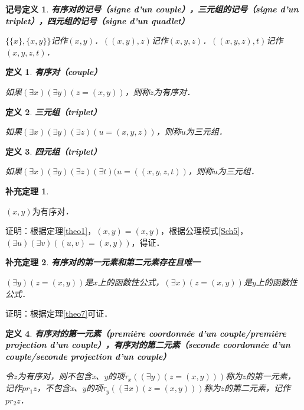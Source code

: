 \documentclass[12pt, a4paper, oneside]{book}
\newtheorem{sign}{记号定义}
\newtheorem{cor}{补充定理}
\newtheorem{de}{定义}
\begin{document}
			\begin{sign}
				\textbf{有序对的记号（signe d'un couple），三元组的记号（signe d'un triplet），四元组的记号（signe d'un quadlet）}
				\par
				$\{\{x\}, \{x, y\}\}$记作$(x, y)$．$((x, y), z)$记作$(x, y, z)$．$((x, y, z), t)$记作$(x, y, z, t)$．
			\end{sign}

			\begin{de}
				\textbf{有序对（couple）}
				\par
				如果$(\exists x)(\exists y)(z=(x, y))$，则称$z$为有序对．
			\end{de}

			\begin{de}
				\textbf{三元组（triplet）}
				\par
				如果$(\exists x)(\exists y)(\exists z)(u=(x, y, z))$，则称$u$为三元组．
			\end{de}

			\begin{de}
				\textbf{四元组（triplet）}
				\par
				如果$(\exists x)(\exists y)(\exists z)(\exists t)(u=((x, y, z, t))$，则称$u$为三元组．
			\end{de}

			\begin{cor}\label{cor19}
				\hfill\par
				$(x, y)\text{为有序对}$．
			\end{cor}
			证明：根据定理\ref{theo1}，$(x, y)=(x, y)$，根据公理模式\ref{Sch5}，$(\exists u)(\exists v)((u, v)=(x, y))$，得证．

			\begin{cor}\label{cor20}
				\textbf{有序对的第一元素和第二元素存在且唯一}
				\par
				$(\exists y)(z=(x, y))$是$x$上的函数性公式，$(\exists x)(z=(x, y))$是$y$上的函数性公式．
			\end{cor}
			证明：根据定理\ref{theo7}可证．

			\begin{de}
				\textbf{有序对的第一元素（première coordonnée d'un couple/première projection d'un couple），有序对的第二元素（seconde coordonnée d'un couple/seconde projection d'un couple）}
				\par
				令$z$为有序对，则不包含x、y的项$\tau_x((\exists y)(z=(x, y)))$称为$z$的第一元素，记作$pr_1z$，不包含x、y的项$\tau_y((\exists x)(z=(x, y)))$称为$z$的第二元素，记作$pr_2z$．
			\end{de}
\end{document}
